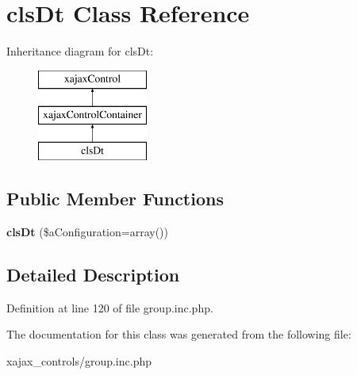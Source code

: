 \hypertarget{classclsDt}{
\section{clsDt Class Reference}
\label{classclsDt}
}
Inheritance diagram for clsDt:\begin{figure}[H]
\begin{center}
\leavevmode
\includegraphics[height=3.000000cm]{classclsDt}
\end{center}
\end{figure}
\subsection*{Public Member Functions}
\begin{DoxyCompactItemize}
\item 
\hypertarget{classclsDt_a06eb7b38fa80f82fb8b7f4ea688edf05}{
{\bfseries clsDt} (\$aConfiguration=array())}
\label{classclsDt_a06eb7b38fa80f82fb8b7f4ea688edf05}

\end{DoxyCompactItemize}


\subsection{Detailed Description}


Definition at line 120 of file group.inc.php.



The documentation for this class was generated from the following file:\begin{DoxyCompactItemize}
\item 
xajax\_\-controls/group.inc.php\end{DoxyCompactItemize}
